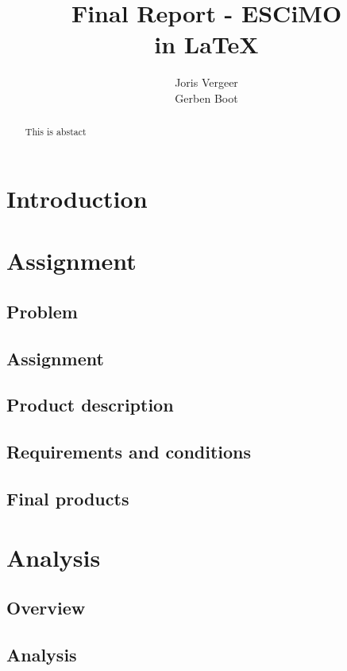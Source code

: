 \documentclass[10pt,a4paper]{report}
\title{
Final Report - ESCiMO \\
in \LaTeX{}
}
\author{
Joris Vergeer\\
Gerben Boot
}
\begin{document}
\maketitle

\begin{abstract}
This is abstact
\end{abstract}

\tableofcontents

\chapter{Introduction}

\chapter{Assignment}
\section{Problem}

\section{Assignment}

\section{Product description}

\section{Requirements and conditions}

\section{Final products}

\chapter{Analysis}
\section{Overview}

\section{Analysis}
\end{document}
